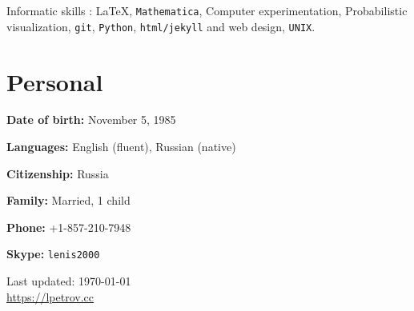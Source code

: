 \documentclass[letterpaper,11pt]{article}
\def\footerlink{https://lpetrov.cc}
\begin{document}



\medskip

Informatic skills : \LaTeX, \texttt{Mathematica}, Computer experimentation,
Probabilistic visualization, \texttt{git}, \texttt{Python},
\texttt{html/jekyll} and web design, \texttt{UNIX}.

\section*{Personal}

\textbf{Date of birth:} November 5, 1985

\textbf{Languages:} English (fluent), Russian (native)

\textbf{Citizenship:} Russia

\textbf{Family:} Married, 1 child

\textbf{Phone:} +1-857-210-7948

\textbf{Skype:} \texttt{lenis2000}

\bigskip

\begin{center}
	\begin{footnotesize}
		Last updated: \today \\ \href{\footerlink}{\url{\footerlink}}
	\end{footnotesize}
\end{center}
\end{document}
